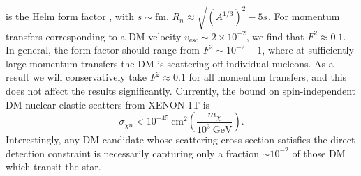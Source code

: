 \documentclass[preprintnumbers,amsmath,amssymb,prd,superscriptaddress]{revtex4}
\newcommand{\GeV}{\text{GeV}}
\def\r{\right)}
\def\l{\left(}
\begin{document}
is the Helm form factor \cite{LUX thesis}, with $s \sim \text{fm}$, $R_n \approx \sqrt{(A^{1/3})^2 - 5s}$.  
For momentum transfers corresponding to a DM velocity $v_\text{esc} \sim 2 \times 10^{-2}$, we find that $F^2 \approx 0.1$. 
In general, the form factor should range from $F^2 \sim 10^{-2} - 1$, where at sufficiently large momentum transfers the DM is scattering off individual nucleons. 
As a result we will conservatively take $F^2 \approx 0.1$ for all momentum transfers, and this does not affect the results significantly. 
Currently, the bound on spin-independent DM nuclear elastic scatters from XENON 1T is
\begin{equation}
\label{eq:xenon}
\sigma_{\chi n} < 10^{-45} ~\text{cm}^2 \l \frac{m_\chi}{10^3 ~\GeV} \r.
\end{equation}
Interestingly, any DM candidate whose scattering cross section satisfies the direct detection constraint is necessarily capturing only a fraction $\sim 10^{-2}$ of those DM which transit the star.
\end{document}
